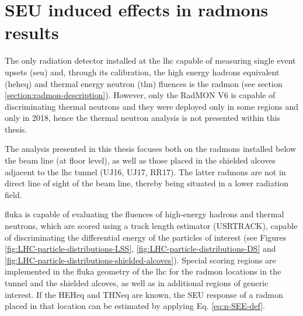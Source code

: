 \documentclass[encoding=utf8,british]{tumphthesis}
\begin{document}
\section{SEU induced effects in \acrshort{radmon}s results}

 The only radiation detector installed at the \acrshort{lhc} capable of measuring single event upsets (\acrshort{seu}) and, through its calibration, the high energy hadrons equivalent (\acrshort{heheq}) and thermal energy neutron (\acrshort{thn}) fluences is the \acrshort{radmon} (see section \ref{section:radmon-description}). However, only the RadMON V6 is capable of discriminating thermal neutrons and they were deployed only in some regions and only in 2018, hence the thermal neutron analysis is not presented within this thesis.
 
 The analysis presented in this thesis focuses both on the \acrshort{radmon}s installed below the beam line (at floor level), as well as those placed in the shielded alcoves adjacent to the \acrshort{lhc} tunnel (UJ16, UJ17, RR17). The latter \acrshort{radmon}s are not in direct line of sight of the beam line, thereby being situated in a lower radiation field.
 
 \newpage

\acrshort{fluka} is capable of evaluating the fluences of high-energy hadrons and thermal neutrons, which are scored using a track length estimator (USRTRACK), capable of discriminating the differential energy of the particles of interest (see Figures \ref{fig:LHC-particle-distributions-LSS}, \ref{fig:LHC-particle-distributions-DS} and \ref{fig:LHC-particle-distributions-shielded-alcoves}).  Special scoring regions are implemented in the \acrshort{fluka} geometry of the \acrshort{lhc} for the \acrshort{radmon} locations in the tunnel and the shielded alcoves, as well as in additional regions of generic interest. If the HEHeq and THNeq are known, the SEU response of a \acrshort{radmon} placed in that location can be estimated by applying Eq. \ref{eq:n-SEE-def}. 
\end{document}
